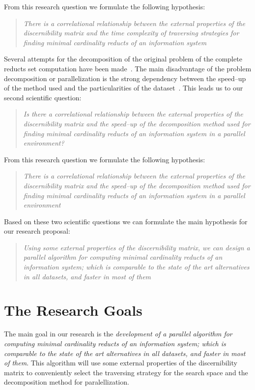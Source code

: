 \documentclass[11pt,authoryear]{elsarticle}
\begin{document}
  From this research question we formulate the following hypothesis:
  
\begin{quote}  
  \emph{There is a correlational relationship between the external properties of the discernibility matrix and the time 
  		complexity of traversing strategies for finding minimal cardinality reducts of an information
  		system}
\end{quote}
  		
  Several attempts for the decomposition of the original problem of the complete reducts set computation have 
  been made~\cite{Strakowski08,Jiao10,Kopczynski14}. The main disadvantage of the problem decomposition or
  parallelization is the strong dependency between the speed--up of the method used and the particularities of 
  the dataset~\cite{Strakowski08}. This leads us to our second scientific question:
  
\begin{quote}
  \emph{Is there a correlational relationship between the external properties of the discernibility matrix and the 
  		speed--up of the decomposition method used for finding minimal cardinality reducts of an information
  		system in a parallel environment?}
\end{quote}

  From this research question we formulate the following hypothesis:
    
\begin{quote}
  \emph{There is a correlational relationship between the external properties of the discernibility matrix and the 
  		speed--up of the decomposition method used for finding minimal cardinality reducts of an information
  		system in a parallel environment}
\end{quote}

  Based on these two scientific questions we can formulate the main hypothesis for our research proposal:
  
\begin{quote}
  \emph{Using some external properties of the discernibility matrix, we can design a parallel algorithm 
  		for computing minimal cardinality reducts of an information system; which is comparable to the 
  		state of the art alternatives in all datasets, and faster in most of them}
\end{quote}  

\section{The Research Goals}\label{Goals} 
  The main goal in our research is the \emph{development of  a parallel algorithm for computing minimal
  cardinality reducts of an information system; which is comparable to the state of the art alternatives 
  in all datasets, and faster in most of them}. This algorithm will use some external properties of the
  discernibility matrix to conveniently select the traversing strategy for the search space and the 
  decomposition method for paralellization.
  
\end{document}
